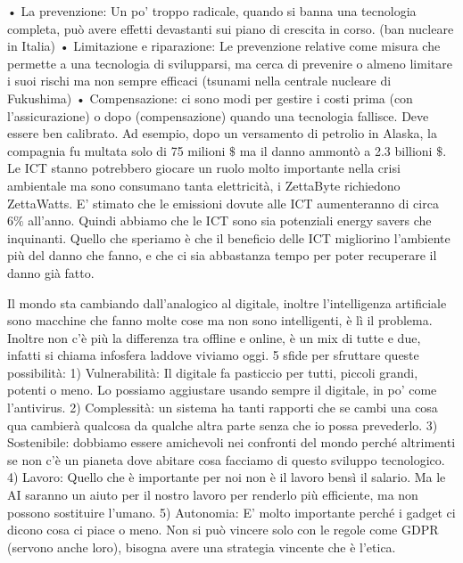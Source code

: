 \documentclass[11pt, a4page, twocolumn]{article}
\begin{document}
    • La prevenzione: Un po’ troppo radicale, quando si banna una tecnologia completa, può avere effetti devastanti sui piano di crescita in corso. (ban nucleare in Italia)
    • Limitazione e riparazione: Le prevenzione relative come misura che permette a una tecnologia di svilupparsi, ma cerca di prevenire o almeno limitare i suoi rischi ma non sempre efficaci (tsunami nella centrale nucleare di Fukushima)
    • Compensazione: ci sono modi per gestire i costi prima (con l’assicurazione) o dopo (compensazione) quando una tecnologia fallisce. Deve essere ben calibrato. Ad esempio, dopo un versamento di petrolio in Alaska, la compagnia fu multata solo di 75 milioni $\$$ ma il danno ammontò a 2.3 billioni $\$$.
Le ICT stanno potrebbero giocare un ruolo molto importante nella crisi ambientale ma sono consumano tanta elettricità, i ZettaByte richiedono ZettaWatts. E’ stimato che le emissioni dovute alle ICT aumenteranno di circa $6\%$ all’anno. Quindi abbiamo che le ICT sono sia potenziali energy savers che inquinanti. Quello che speriamo è che il beneficio delle ICT migliorino l’ambiente più del danno che fanno, e che ci sia abbastanza tempo per poter recuperare il danno già fatto.



Il mondo sta cambiando dall’analogico al digitale, inoltre l’intelligenza artificiale sono macchine che fanno molte cose ma non sono intelligenti, è lì il problema. Inoltre non c’è più la differenza tra offline e online, è un mix di tutte e due, infatti si chiama infosfera laddove viviamo oggi. 
5 sfide per sfruttare queste possibilità:
    1) Vulnerabilità: Il digitale fa pasticcio per tutti, piccoli grandi, potenti o meno. Lo possiamo aggiustare usando sempre il digitale, in po’ come l’antivirus.
    2) Complessità: un sistema ha tanti rapporti che se cambi una cosa qua cambierà qualcosa da qualche altra parte senza che io possa prevederlo. 
    3) Sostenibile: dobbiamo essere amichevoli nei confronti del mondo perché altrimenti se non c’è un pianeta dove abitare cosa facciamo di questo sviluppo tecnologico. 
    4) Lavoro: Quello che è importante per noi non è il lavoro bensì il salario. Ma le AI saranno un aiuto per il nostro lavoro per renderlo più efficiente, ma non possono sostituire l’umano.
    5) Autonomia: E’ molto importante perché i gadget ci dicono cosa ci piace o meno.
Non si può vincere solo con le regole come GDPR (servono anche loro), bisogna avere una strategia vincente che è l’etica.
\end{document}
